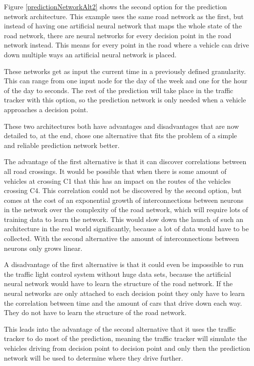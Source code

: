 
Figure \ref{predictionNetworkAlt2} shows the second option for the prediction network architecture. This example uses the same road network as the first, but instead of having one artificial neural network that maps the whole state of the road network, there are neural networks for every decision point in the road network instead. This means for every point in the road where a vehicle can drive down multiple ways an artificial neural network is placed.

These networks get as input the current time in a previously defined granularity. This can range from one input node for the day of the week and one for the hour of the day to seconds. The rest of the prediction will take place in the traffic tracker with this option, so the prediction network is only needed when a vehicle approaches a decision point.

These two architectures both have advantages and disadvantages that are now detailed to, at the end, chose one alternative that fits the problem of a simple and reliable prediction network better.

The advantage of the first alternative is that it can discover correlations between all road crossings. It would be possible that when there is some amount of vehicles at crossing C1 that this has an impact on the routes of the vehicles crossing C4. This correlation could not be discovered by the second option, but comes at the cost of an exponential growth of interconnections between neurons in the network over the complexity of the road network, which will require lots of training data to learn the network. This would slow down the launch of such an architecture in the real world significantly, because a lot of data would have to be collected. With the second alternative the amount of interconnections between neurons only grows linear.

A disadvantage of the first alternative is that it could even be impossible to run the traffic light control system without huge data sets, because the artificial neural network would have to learn the structure of the road network. If the neural networks are only attached to each decision point they only have to learn the correlation between time and the amount of cars that drive down each way. They do not have to learn the structure of the road network.

This leads into the advantage of the second alternative that it uses the traffic tracker to do most of the prediction, meaning the traffic tracker will simulate the vehicles driving from decision point to decision point and only then the prediction network will be used to determine where they drive further.

